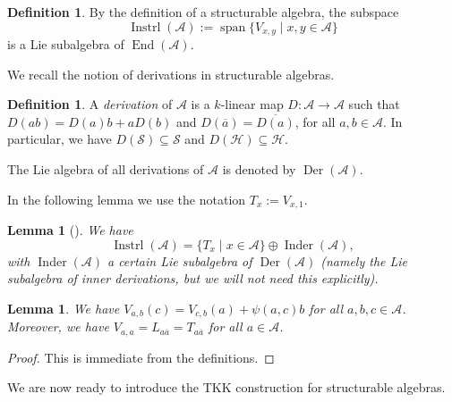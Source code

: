 \documentclass[oneside,a4paper]{amsart} %
\newtheorem{lemma}[theorem]{Lemma}
\theoremstyle{definition}
\newtheorem{definition}[theorem]{Definition}
\DeclareMathOperator{\Inst}{Instrl}
\DeclareMathOperator{\Inder}{Inder}
\DeclareMathOperator{\Der}{Der}
\DeclareMathOperator{\End}{End}
\newcommand{\A}{\mathcal{A}}
\renewcommand{\SS}{\mathcal{S}}
\newcommand{\HH}{\mathcal{H}}
\numberwithin{equation}{section}
\begin{document}
\begin{definition}
	By the definition of a structurable algebra, the subspace
	\[ \Inst(\A) := \operatorname{span}\{V_{x,y}\mid x,y\in \A\}\]
	is a Lie subalgebra of $\End(\A)$.
\end{definition}

We recall the notion of derivations in structurable algebras.

\begin{definition}
	A \textit{derivation} of $\A$ is a $k$-linear map $D \colon \A\rightarrow\A$ such that $D(ab)=D(a)b+aD(b)$ and $D(\overline a)=\overline{D(a)}$, for all $a,b\in \A$. In particular, we have $D(\SS) \subseteq \SS$ and $D(\HH) \subseteq \HH$.
	
	The Lie algebra of all derivations of $\A$ is denoted by $\Der(\A)$. 
\end{definition}

In the following lemma we use the notation $T_x:=V_{x,1}$.
\begin{lemma}[{\cite[page 1840]{Allison1979}}]
\label{S1 Decom Inst}
We have 
\[ \Inst(\A)=\{T_x\mid x\in \A\} \oplus \Inder(\A),\]
with $\Inder(\A)$ a certain Lie subalgebra of $\Der(\A)$ (namely the Lie subalgebra of inner derivations, but we will not need this explicitly).
\end{lemma}

\begin{lemma}
\label{V operator symmetry}
	We have	$V_{a,b}(c)=V_{c,b}(a)+\psi(a,c)b$ for all $a,b,c \in \A$.
	Moreover, we have $V_{a,a} = L_{a\overline{a}} = T_{a\overline{a}}$ for all $a \in \A$.
\end{lemma}
\begin{proof}
    This is immediate from the definitions.
\end{proof}



We are now ready to introduce the TKK construction for structurable algebras.
\end{document}
